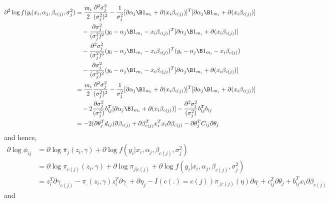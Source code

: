 \begin{align*}
\partial^{2} \log f(y_{i}|x_{i},\alpha_{j},\beta_{c(j)},\sigma^{2}_{j}) &= \frac{m_{i}}{2}\frac{\partial^{2}\sigma_{j}^{2}}{(\sigma_{j}^{2})^{2}}-\frac{1}{\sigma_{j}^{2}}[\partial \alpha_{j}\B 1_{m_i}+\partial(x_{i}\beta_{c(j)})]^{T}[\partial \alpha_{j}\B 1_{m_i}+\partial(x_{i}\beta_{c(j)})]\\
&\quad-\frac{\partial \sigma_{j}^{2}}{(\sigma^{2}_{j})^{2}}(y_{i}-\alpha_{j}\B 1_{m_i}-x_{i}\beta_{c(j)})^{T}[\partial \alpha_{j}\B 1_{m_i}+\partial(x_{i}\beta_{c(j)})]\\
&\quad-\frac{\partial^{2}\sigma_{j}^{2}}{(\sigma_{j}^{2})^{3}}(y_{i}-\alpha_{j}\B 1_{m_i}-x_{i}\beta_{c(j)})^{T}(y_{i}-\alpha_{j}\B 1_{m_i}-x_{i}\beta_{c(j)})\\
&\quad-\frac{\partial\sigma_{j}^{2}}{(\sigma_{j}^{2})^{2}}(y_{i}-\alpha_{j}\B 1_{m_i}-x_{i}\beta_{c(j)})^{T}[\partial \alpha_{j}\B 1_{m_i}+\partial(x_{i}\beta_{c(j)})]\\
&= \frac{m_{i}}{2}\frac{\partial^{2}\sigma_{j}^{2}}{(\sigma_{j}^{2})^{2}}-\frac{1}{\sigma_{j}^{2}}[\partial \alpha_{j}\B 1_{m_i}+\partial(x_{i}\beta_{c(j)})]^{T}[\partial\alpha_{j}\B 1_{m_i}+\partial(x_{i}\beta_{c(j)})]\\
&\quad-2\frac{\partial \sigma_{j}^{2}}{(\sigma^{2}_{j})}b_{ij}^{T}[\partial\alpha_{j}\B 1_{m_i}+\partial(x_{i}\beta_{c(j)})]-\frac{\partial^{2}\sigma_{j}^{2}}{(\sigma_{j}^{2})}b_{ij}^{T}b_{ij}\\
&= -2(\partial \theta_{j}^{T}d_{ij})\partial\beta_{c(j)}+\partial\beta_{c(j)}^{T}x_{i}^{T}x_{i}\partial\beta_{c(j)}-\partial \theta_{j}^{T}C_{ij}\partial \theta_{j}\\
\end{align*}
and hence,
\begin{align}\label{dphi}
\partial \log \phi_{ij} &= \partial \log \bar{\pi}_{j}(z_{i},\gamma)+\partial \log f(y_{i}|x_{i},\alpha_{j},\beta_{c(j)},\sigma^{2}_{j})\nonumber\\
&= \partial \log \pi_{c(j)}(z_{i},\gamma)+\partial \log \pi_{j|c(j)}+\partial \log f(y_{i}|x_{i},\alpha_{j},\beta_{c(j)},\sigma^{2}_{j})\nonumber\\
&= z_{i}^{T}\partial \gamma_{c(j)}-\pi_{.}(z_{i},\gamma)z_{i}^{T}\partial \gamma_{.}+ \partial \eta_{j} - I(c(.)=c(j))\pi_{.|c(j)}(\eta)\partial \eta_{.}+c_{ij}^{T}\partial\theta_{j}+b_{ij}^{T}x_{i}\partial \beta_{c(j)}
\end{align}
and
